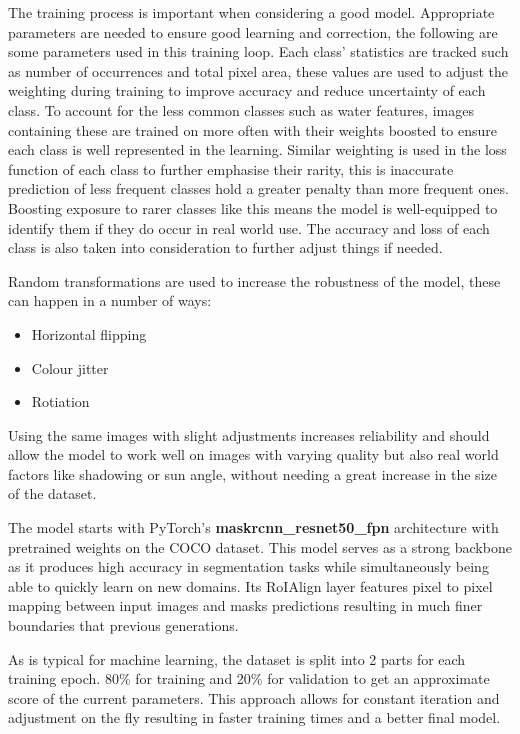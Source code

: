 \documentclass[final]{cmpreport_02}
\begin{document}
The training process is important when considering a good model. 
Appropriate parameters are needed to ensure good learning and correction, the following are some parameters used in this training loop.
Each class' statistics are tracked such as number of occurrences and total pixel area, these values are used to adjust the weighting during training to improve accuracy and reduce uncertainty of each class.
To account for the less common classes such as water features, images containing these are trained on more often with their weights boosted to ensure each class is well represented in the learning.
Similar weighting is used in the loss function of each class to further emphasise their rarity, this is inaccurate prediction of less frequent classes hold a greater penalty than more frequent ones.
Boosting exposure to rarer classes like this means the model is well-equipped to identify them if they do occur in real world use.
The accuracy and loss of each class is also taken into consideration to further adjust things if needed.

Random transformations are used to increase the robustness of the model, these can happen in a number of ways:

\begin{itemize}
	\item{Horizontal flipping}
	\item{Colour jitter}
	\item{Rotiation}
\end{itemize}
Using the same images with slight adjustments increases reliability and should allow the model to work well on images with varying quality but also real world factors like shadowing or sun angle, without needing a great increase in the size of the dataset.

The model starts with PyTorch's \textbf{maskrcnn\_resnet50\_fpn} architecture with pretrained weights on the COCO \citep{coco} dataset.
This model serves as a strong backbone as it produces high accuracy in segmentation tasks while simultaneously being able to quickly learn on new domains.
Its RoIAlign layer features pixel to pixel mapping between input images and masks predictions resulting in much finer boundaries that previous generations.

As is typical for machine learning, the dataset is split into 2 parts for each training epoch. 80\% for training and 20\% for validation to get an approximate score of the current parameters.
This approach allows for constant iteration and adjustment on the fly resulting in faster training times and a better final model.
\end{document}
